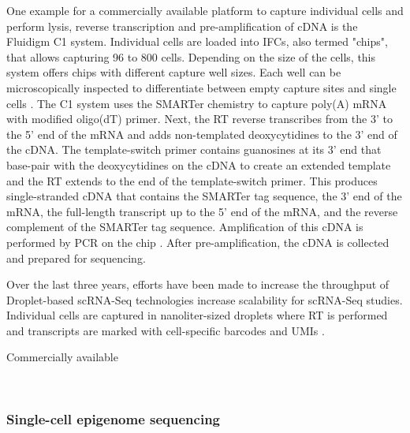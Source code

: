One example for a commercially available platform to capture individual cells and perform lysis, reverse transcription and pre-amplification of cDNA is the Fluidigm\textregistered{} C1 system. Individual cells are loaded into \glspl{IFC}, also termed "chips", that allows capturing 96 to 800 cells. Depending on the size of the cells, this system offers chips with different capture well sizes. Each well can be microscopically inspected to differentiate between empty capture sites and single cells \citep{Kolodziejczyk2015review}. The C1 system uses the SMARTer\textregistered{} chemistry to capture poly(A) mRNA with modified oligo(dT) primer. Next, the \gls{RT} reverse transcribes from the 3' to the 5' end of the mRNA and adds non-templated deoxycytidines to the 3' end of the cDNA. The template-switch primer contains guanosines at its 3' end that base-pair with the deoxycytidines on the cDNA to create an extended template and the RT extends to the end of the template-switch primer. This produces single-stranded cDNA that contains the SMARTer tag sequence, the 3' end of the mRNA, the full-length transcript up to the 5' end of the mRNA, and the reverse complement of the SMARTer tag sequence. Amplification of this cDNA is performed by PCR on the chip \cite{Fluidigm2015}. After pre-amplification, the cDNA is collected and prepared for sequencing.

 
Over the last three years, efforts have been made to increase the throughput of 
Droplet-based scRNA-Seq technologies increase scalability for scRNA-Seq studies. Individual cells are captured in nanoliter-sized droplets where RT is performed and transcripts are marked with cell-specific barcodes and UMIs \citep{Klein2015, Macosko2015}. 

Commercially available

\\





\subsubsection{Single-cell epigenome sequencing}

